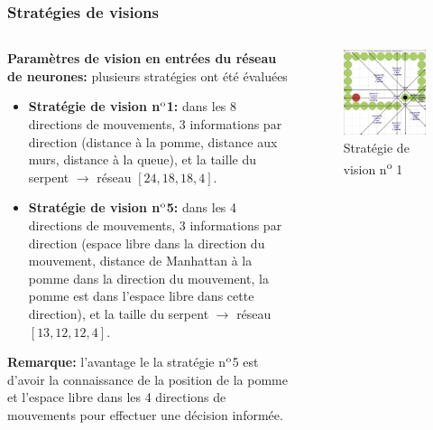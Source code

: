 \documentclass[10pt]{beamer}
\begin{document}
\begin{frame}
\frametitle{Stratégies de visions}
\begin{columns}[T]
\begin{column}{0.60\textwidth}
\footnotesize
\textbf{Paramètres de vision en entrées du réseau de neurones:} plusieurs stratégies ont été évaluées
\begin{itemize}
\footnotesize
\item \textbf{Stratégie de vision n$\textsuperscript{o}$1:} dans les 8 directions de mouvements, 3 informations par direction (distance à la pomme, distance aux murs, distance à la queue), et la taille du serpent $\rightarrow$ réseau $\left[24, 18, 18, 4\right]$.
\item \textbf{Stratégie de vision n$\textsuperscript{o}$5:} dans les 4 directions de mouvements, 3 informations par direction (espace libre dans la direction du mouvement, distance de Manhattan à la pomme dans la direction du mouvement, la pomme est dans l'espace libre dans cette direction), et la taille du serpent $\rightarrow$ réseau $\left[13, 12, 12, 4\right]$.
\end{itemize}
\textbf{Remarque:} l'avantage le la stratégie n$\textsuperscript{o}$5 est d'avoir la connaissance de la position de la pomme et l'espace libre dans les 4 directions de mouvements pour effectuer une décision informée.
\end{column}
\begin{column}{0.40\textwidth}

\begin{figure}
\vspace{-1.2cm}
\includegraphics[width=1\textwidth]{snake_vision_illustration2.png}
\vspace{-0.7cm}
\caption*{\tiny Stratégie de vision n\textsuperscript{o} 1}
\end{figure}


\end{column}
\end{columns}
\end{frame}
\end{document}
